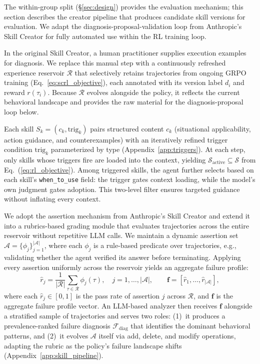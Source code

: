 \documentclass{article}
\theoremstyle{plain}
\theoremstyle{definition}
\theoremstyle{remark}
\begin{document}
The within-group split (\S\ref{sec:design}) provides the evaluation mechanism; this section describes the creator pipeline that produces candidate skill versions for evaluation. We adapt the diagnosis-proposal-validation loop from Anthropic's Skill Creator \citep{anthropic2025skillcreator} for fully automated use within the RL training loop.

In the original Skill Creator, a human practitioner supplies execution examples for diagnosis. We replace this manual step with a continuously refreshed experience reservoir $\mathcal{R}$ that selectively retains trajectories from ongoing GRPO training (Eq.~\ref{eq:scrl_objective}), each annotated with its version label $d_i$ and reward $r(\tau_i)$. Because $\mathcal{R}$ evolves alongside the policy, it reflects the current behavioral landscape and provides the raw material for the diagnosis-proposal loop below.

Each skill $S_k = (c_k, \text{trig}_k)$ pairs structured content $c_k$ (situational applicability, action guidance, and counterexamples) with an iteratively refined trigger condition $\text{trig}_k$ parameterized by type (Appendix~\ref{app:triggers}). At each step, only skills whose triggers fire are loaded into the context, yielding $\mathcal{S}_{\text{active}} \subseteq \mathcal{S}$ from Eq.~(\ref{eq:rl_objective}). Among triggered skills, the agent further selects based on each skill's \texttt{when\_to\_use} field: the trigger gates context loading, while the model's own judgment gates adoption. This two-level filter ensures targeted guidance without inflating every context.

We adopt the assertion mechanism from Anthropic's Skill Creator and extend it into a rubrics-based grading module that evaluates trajectories across the entire reservoir without repetitive LLM calls. We maintain a dynamic assertion set $\mathcal{A} = \{\phi_j\}_{j=1}^{|\mathcal{A}|}$, where each $\phi_j$ is a rule-based predicate over trajectories, e.g., validating whether the agent verified its answer before terminating. Applying every assertion uniformly across the reservoir yields an aggregate failure profile:
\begin{equation}
    \hat{r}_j = \frac{1}{|\mathcal{R}|}\sum_{\tau \in \mathcal{R}} \phi_j(\tau), \quad j = 1, \ldots, |\mathcal{A}|, \qquad \mathbf{f} = [\hat{r}_1, \ldots, \hat{r}_{|\mathcal{A}|}],
    \label{eq:failure_profile}
\end{equation}
where each $\hat{r}_j \in [0,1]$ is the pass rate of assertion $j$ across $\mathcal{R}$, and $\mathbf{f}$ is the aggregate failure profile vector. An LLM-based analyzer then receives $\mathbf{f}$ alongside a stratified sample of trajectories and serves two roles: (1)~it produces a prevalence-ranked failure diagnosis $\mathcal{F}_{\text{diag}}$ that identifies the dominant behavioral patterns, and (2)~it evolves $\mathcal{A}$ itself via add, delete, and modify operations, adapting the rubric as the policy's failure landscape shifts (Appendix~\ref{app:skill_pipeline}).
\end{document}
